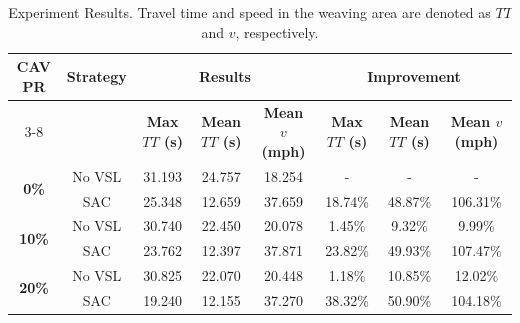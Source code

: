 \documentclass[11pt, letterpaper]{article}
\begin{document}
\begin{table}[!ht]
\caption{Experiment Results. Travel time and speed in the weaving area are denoted as $TT$ and $v$, respectively.}
\label{tab:2}
\centering
\begin{tabular}{@{}cccccccc@{}}
\toprule
\multirow{2}{*}{\textbf{CAV PR}} & \multirow{2}{*}{\textbf{Strategy}} & \multicolumn{3}{c}{\textbf{Results}}                                                     & \multicolumn{3}{c}{\textbf{Improvement}}                                                 \\ \cmidrule(l){3-8}
                                               &                                            & \textbf{Max $TT$ (s)} & \textbf{Mean $TT$ (s)} & \textbf{Mean $v$ (mph)} & \textbf{Max $TT$ (s)} & \textbf{Mean $TT$ (s)} & \textbf{Mean $v$ (mph)} \\ \midrule
\multirow{2}{*}{\textbf{0\%}}                  & No VSL                                     & 31.193                       & 24.757                        & 18.254                    & -                            & -                             & -                         \\
                                               & SAC                                        & 25.348                       & 12.659                        & 37.659                    & 18.74\%                      & 48.87\%                       & 106.31\%                  \\
\multirow{2}{*}{\textbf{10\%}}                 & No VSL                                     & 30.740                       & 22.450                        & 20.078                    & 1.45\%                       & 9.32\%                        & 9.99\%                    \\
                                               & SAC                                        & 23.762                       & 12.397                        & 37.871                    & 23.82\%                      & 49.93\%                       & 107.47\%                  \\
\multirow{2}{*}{\textbf{20\%}}                 & No VSL                                     & 30.825                       & 22.070                        & 20.448                    & 1.18\%                       & 10.85\%                       & 12.02\%                   \\
                                               & SAC                                        & 19.240                       & 12.155                        & 37.270                    & 38.32\%                      & 50.90\%                       & 104.18\%                  \\

\end{tabular}
\end{table}
\end{document}
